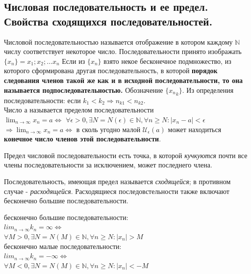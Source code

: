 \documentclass[oneside]{book}
\begin{document}
\begin{enumerate}
\chapter[Последовательности\\]{Числовая последовательность и ее предел. Свойства сходящихся последовательностей.\\}
Числовой последовательностью называется отображение в котором каждому $\mathbb{N}$ числу соответствует
некоторое число. Последовательности принято изображать $\{x_n\} = x_1; x_2; \dots x_n$
Если из $\{x_n\}$ взято некое бесконечное подмножество, из которого сформирована другая последовательность,
в которой \textbf{порядок следования членов такой же как и в исходной последовательности, то она
называется подпоследовательностью.} Обозначение $\{{x_n}_k\}$.
Из определения последовательности: если $k_1 < k_2 \Rightarrow n_{k1} < n_{k2}$.\\
Число а называется пределом последовательности \\ $\lim_{n \rightarrow \infty}{x_n = a} \Leftrightarrow$
$\forall\epsilon>0,  \exists N=N(\epsilon) \in \mathbb{N}, \forall n \geq N: |x_n - a| < \epsilon$
$\Rightarrow \lim_{n \rightarrow \infty}{x_n = a} \Leftrightarrow$ в сколь угодно малой $\mathcal{U}_\epsilon(a)$
может находиться \textbf{конечное число членов этой последовательности}.

Предел числовой последовательности есть точка, в которой \textit{кучкуются} почти все члены последовательности
за исключением, может последнего члена.

Последовательность, имеющая предел называется \textit{сходящейся}; в противном случае - \textit{расходящейся}.
Расходящиеся последовстельности также включают бесконечно большие последовательности.
\begin{center}
    бесконечно большие последовательности:\\
    $lim_{n \rightarrow \infty}{k_n} = \infty \Leftrightarrow$ \\
    $\forall M > 0, \exists N=N(M) \in \mathbb{N}, \forall n \geq N: |x_n| > M$ \\
    бесконечно малые последовательности:\\
    $lim_{n \rightarrow \infty}{k_n} = -\infty \Leftrightarrow$\\
    $\forall M < 0, \exists N=N(M) \in \mathbb{N}, \forall n \geq N: |x_n| < -M$ \\
\end{center}


\end{enumerate}
\end{document}
